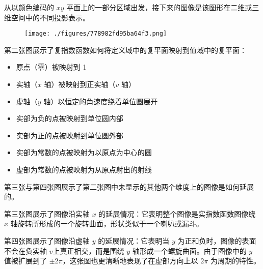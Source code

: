 从以颜色编码的 $xy$ 平面上的一部分区域出发，接下来的图像是该图形在二维或三维空间中的不同投影表示。
\begin{figure}[ht]
\centering
\texttt{[image: ./figures/778982fd95ba64f3.png]}
\caption{} \label{fig_ZShs_7}
\end{figure}
第二张图展示了复指数函数如何将定义域中的复平面映射到值域中的复平面：
\begin{itemize}
\item 原点（零）被映射到 1
\item 实轴（$x$ 轴）被映射到正实轴（$v$ 轴）
\item 虚轴（$y$ 轴）以恒定的角速度绕着单位圆展开
\item 实部为负的点被映射到单位圆内部
\item 实部为正的点被映射到单位圆外部
\item 实部为常数的点被映射为以原点为中心的圆
\item 虚部为常数的点被映射为从原点射出的射线
\end{itemize}
第三张与第四张图展示了第二张图中未显示的其他两个维度上的图像是如何延展的。

第三张图展示了图像沿实轴 $x$ 的延展情况：它表明整个图像是实指数函数图像绕 $x$ 轴旋转所形成的一个旋转曲面，形状类似于一个喇叭或漏斗。

第四张图展示了图像沿虚轴 $y$ 的延展情况：它表明当 $y$ 为正和负时，图像的表面不会在负实轴 $v$上真正相交，而是围绕 $y$ 轴形成一个螺旋曲面。由于图像中的 $y$ 值被扩展到了 $\pm 2\pi$，这张图也更清晰地表现了在虚部方向上以 $2\pi$ 为周期的特性。
